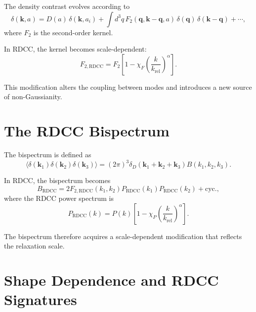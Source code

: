 \documentclass[11pt,a4paper]{article}
\begin{document}
The density contrast evolves according to
\begin{equation}
    \delta(\mathbf{k},a)
    = D(a)\,\delta(\mathbf{k},a_{i})
      + \int d^{3}q\,
        F_{2}(\mathbf{q},\mathbf{k}-\mathbf{q},a)\,
        \delta(\mathbf{q})\,
        \delta(\mathbf{k}-\mathbf{q})
      + \cdots,
\end{equation}
where $F_{2}$ is the second-order kernel.

In RDCC, the kernel becomes scale-dependent:
\begin{equation}
    F_{2,\mathrm{RDCC}}
    = F_{2}
      \left[
        1 - \chi_{F}
        \left(\frac{k}{k_{\mathrm{rel}}}\right)^{\alpha}
      \right].
\end{equation}

This modification alters the coupling between modes and introduces a new source of 
non-Gaussianity.
\section{The RDCC Bispectrum}

The bispectrum is defined as
\begin{equation}
    \langle
      \delta(\mathbf{k}_{1})
      \delta(\mathbf{k}_{2})
      \delta(\mathbf{k}_{3})
    \rangle
    = (2\pi)^{3}
      \delta_{D}(\mathbf{k}_{1}
                +\mathbf{k}_{2}
                +\mathbf{k}_{3})
      B(k_{1},k_{2},k_{3}).
\end{equation}

In RDCC, the bispectrum becomes
\begin{equation}
    B_{\mathrm{RDCC}}
    = 2 F_{2,\mathrm{RDCC}}(k_{1},k_{2})
      P_{\mathrm{RDCC}}(k_{1})
      P_{\mathrm{RDCC}}(k_{2})
      + \text{cyc.},
\end{equation}
where the RDCC power spectrum is
\begin{equation}
    P_{\mathrm{RDCC}}(k)
    = P(k)
      \left[
        1 - \chi_{P}
        \left(\frac{k}{k_{\mathrm{rel}}}\right)^{\alpha}
      \right].
\end{equation}

The bispectrum therefore acquires a scale-dependent modification that reflects the 
relaxation scale.
\section{Shape Dependence and RDCC Signatures}
\end{document}
